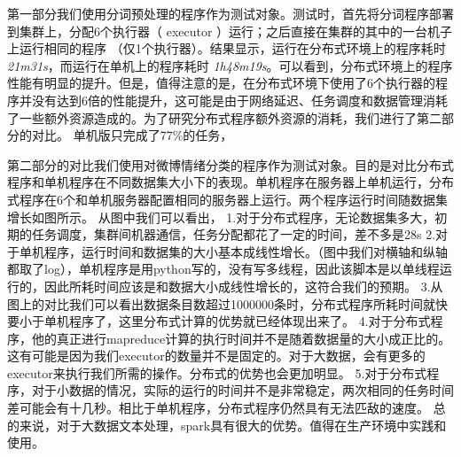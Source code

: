 \documentclass[12pt, oneside]{article}
\begin{document}
\begin{spacing}{1.5}
\begin{CJK}{UTF8}{gbsn}
第一部分我们使用分词预处理的程序作为测试对象。测试时，首先将分词程序部署到集群上，分配6个执行器（ executor ）运行；之后直接在集群的其中的一台机子上运行相同的程序 （仅1个执行器）。结果显示，运行在分布式环境上的程序耗时 {\it 21m31s}，而运行在单机上的程序耗时 {\it 1h48m19s}。可以看到，分布式环境上的程序性能有明显的提升。但是，值得注意的是，在分布式环境下使用了6个执行器的程序并没有达到6倍的性能提升，这可能是由于网络延迟、任务调度和数据管理消耗了一些额外资源造成的。为了研究分布式程序额外资源的消耗，我们进行了第二部分的对比。
单机版只完成了77\%的任务，

第二部分的对比我们使用对微博情绪分类的程序作为测试对象。目的是对比分布式程序和单机程序在不同数据集大小下的表现。单机程序在服务器上单机运行，分布式程序在6个和单机服务器配置相同的服务器上运行。两个程序运行时间随数据集增长如图所示。
从图中我们可以看出，
1.对于分布式程序，无论数据集多大，初期的任务调度，集群间机器通信，任务分配都花了一定的时间，差不多是28s
2.对于单机程序，运行时间和数据集的大小基本成线性增长。（图中我们对横轴和纵轴都取了log），单机程序是用python写的，没有写多线程，因此该脚本是以单线程运行的，因此所耗时间应该是和数据大小成线性增长的，这符合我们的预期。
3.从图上的对比我们可以看出数据条目数超过1000000条时，分布式程序所耗时间就快要小于单机程序了，这里分布式计算的优势就已经体现出来了。
4.对于分布式程序，他的真正进行mapreduce计算的执行时间并不是随着数据量的大小成正比的。这有可能是因为我们executor的数量并不是固定的。对于大数据，会有更多的executor来执行我们所需的操作。分布式的优势也会更加明显。
5.对于分布式程序，对于小数据的情况，实际的运行的时间并不是非常稳定，两次相同的任务时间差可能会有十几秒。相比于单机程序，分布式程序仍然具有无法匹敌的速度。
总的来说，对于大数据文本处理，spark具有很大的优势。值得在生产环境中实践和使用。

\newpage
\renewcommand\refname{参考文献}



\end{CJK}
\end{spacing}
\end{document}
